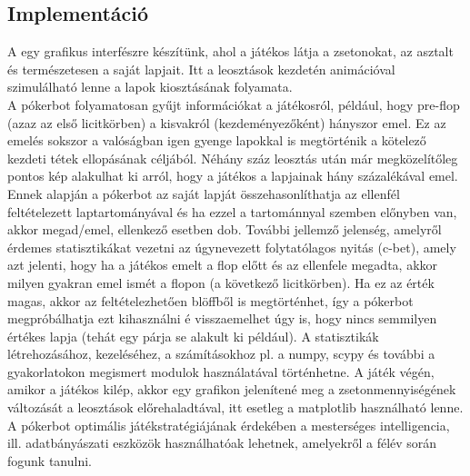 \documentclass[a4paper]{article}
\begin{document}
\subsection*{Implementáció}
A egy grafikus interfészre készítünk, ahol a játékos látja a zsetonokat, az asztalt és természetesen a saját lapjait. Itt a leosztások kezdetén animációval szimulálható lenne a lapok kiosztásának folyamata.\\
A pókerbot folyamatosan gyűjt információkat a játékosról, például, hogy pre-flop (azaz az első licitkörben) a kisvakról (kezdeményezőként) hányszor emel. Ez az emelés sokszor a valóságban igen gyenge lapokkal is megtörténik a kötelező kezdeti tétek ellopásának céljából. Néhány száz leosztás után már megközelítőleg pontos kép alakulhat ki arról, hogy a játékos a lapjainak hány százalékával emel. Ennek alapján a pókerbot az saját lapját összehasonlíthatja az ellenfél feltételezett laptartományával és ha ezzel a tartománnyal szemben előnyben van, akkor megad/emel, ellenkező esetben dob.
További jellemző jelenség, amelyről érdemes statisztikákat vezetni az úgynevezett folytatólagos nyitás (c-bet), amely azt jelenti, hogy ha a játékos emelt a flop előtt és az ellenfele megadta, akkor milyen gyakran emel ismét a flopon (a következő licitkörben). Ha ez az érték magas, akkor az feltételezhetően blöffből is megtörténhet, így a pókerbot megpróbálhatja ezt kihasználni é visszaemelhet úgy is, hogy nincs semmilyen értékes lapja (tehát egy párja se alakult ki például). A statisztikák létrehozásához, kezeléséhez, a számításokhoz pl. a numpy, scypy és további a gyakorlatokon megismert modulok használatával történhetne. A játék végén, amikor a játékos kilép, akkor egy grafikon jelenítené meg a zsetonmennyiségének változását a leosztások előrehaladtával, itt esetleg a matplotlib használható lenne.
A pókerbot optimális játékstratégiájának érdekében a mesterséges intelligencia, ill. adatbányászati eszközök használhatóak lehetnek, amelyekről a félév során fogunk tanulni.
\end{document}
